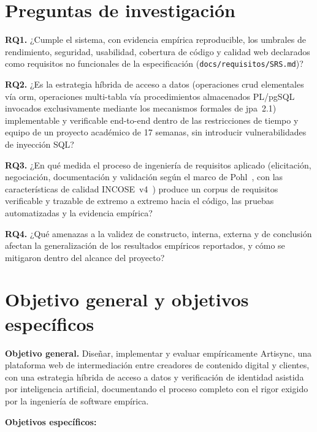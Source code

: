 \section{Preguntas de investigación}

\textbf{RQ1.} ¿Cumple el sistema, con evidencia empírica reproducible, los
umbrales de rendimiento, seguridad, usabilidad, cobertura de código y
calidad web declarados como requisitos no funcionales de la especificación
(\texttt{docs/requisitos/SRS.md})?

\textbf{RQ2.} ¿Es la estrategia híbrida de acceso a datos (operaciones
\gls{crud} elementales vía \gls{orm}, operaciones multi-tabla vía procedimientos
almacenados PL/pgSQL invocados exclusivamente mediante los mecanismos
formales de \gls{jpa}~2.1) implementable y verificable end-to-end dentro de las
restricciones de tiempo y equipo de un proyecto académico de 17 semanas,
sin introducir vulnerabilidades de inyección SQL?

\textbf{RQ3.} ¿En qué medida el proceso de ingeniería de requisitos
aplicado (elicitación, negociación, documentación y validación según el
marco de Pohl~\cite{POHL2010}, con las características de calidad
INCOSE~v4~\cite{INCOSE2023}) produce un corpus de requisitos verificable y
trazable de extremo a extremo hacia el código, las pruebas automatizadas y
la evidencia empírica?

\textbf{RQ4.} ¿Qué amenazas a la validez de constructo, interna, externa y
de conclusión afectan la generalización de los resultados empíricos
reportados, y cómo se mitigaron dentro del alcance del proyecto?

\section{Objetivo general y objetivos específicos}

\textbf{Objetivo general.} Diseñar, implementar y evaluar empíricamente
Artisync, una plataforma web de intermediación entre creadores de
contenido digital y clientes, con una estrategia híbrida de acceso a datos
y verificación de identidad asistida por inteligencia artificial,
documentando el proceso completo con el rigor exigido por la ingeniería de
software empírica.

\textbf{Objetivos específicos:}

